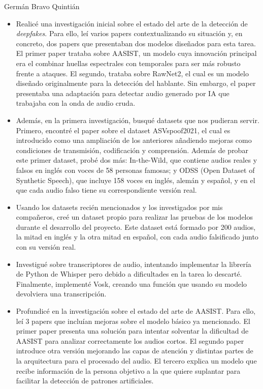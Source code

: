 \begin{contribucion}{Germán Bravo Quintián}
\begin{itemize}
    \item Realicé una investigación inicial sobre el estado del arte de la detección de \textit{deepfakes}. Para ello, leí varios papers contextualizando su situación y, en concreto, dos papers que presentaban dos modelos diseñados para esta tarea. El primer paper trataba sobre AASIST, un modelo cuya innovación principal era el combinar huellas espectrales con temporales para ser más robusto frente a ataques. El segundo, trataba sobre RawNet2, el cual es un modelo diseñado originalmente para la detección del hablante. Sin embargo, el paper presentaba una adaptación para detectar audio generado por IA que trabajaba con la onda de audio cruda.
    \item Además, en la primera investigación, busqué datasets que nos pudieran servir. Primero, encontré el paper sobre el dataset ASVspoof2021, el cual es introducido como una ampliación de los anteriores añadiendo mejoras como condiciones de transmisión, codificación y comprensión. Además de probar este primer dataset, probé dos más: In-the-Wild, que contiene audios reales y falsos en inglés con voces de 58 personas famosas; y ODSS (Open Dataset of Synthetic Speech), que incluye 158 voces en inglés, alemán y español, y en el que cada audio falso tiene su correspondiente versión real.
    \item Usando los datasets recién mencionados y los investigados por mis compañeros, creé un dataset propio para realizar las pruebas de los modelos durante el desarrollo del proyecto. Este dataset está formado por 200 audios, la mitad en inglés y la otra mitad en español, con cada audio falsificado junto con su versión real.
    \item Investigué sobre transcriptores de audio, intentando implementar la librería de Python de Whisper pero debido a dificultades en la tarea lo descarté. Finalmente, implementé Vosk, creando una función que usando su modelo devolviera una transcripción.
    \item Profundicé en la investigación sobre el estado del arte de AASIST. Para ello, leí 3 papers que incluían mejoras sobre el modelo básico ya mencionado. El primer paper presenta una solución para intentar solventar la dificultad de AASIST para analizar correctamente los audios cortos. El segundo paper introduce otra versión mejorando las capas de atención y distintas partes de la arquitectura para el procesado del audio. El tercero explica un modelo que recibe información de la persona objetivo a la que quiere suplantar para facilitar la detección de patrones artificiales.

\end{itemize}
\end{contribucion}
